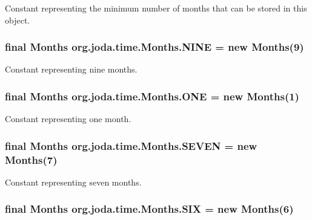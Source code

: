 Constant representing the minimum number of months that can be stored in this object. \hypertarget{classorg_1_1joda_1_1time_1_1_months_a513dd55161ce531a540faa3a09f97bb5}{
\subsubsection[{N\-I\-N\-E}]{\setlength{\rightskip}{0pt plus 5cm}final {\bf Months} org.\-joda.\-time.\-Months.\-N\-I\-N\-E = new {\bf Months}(9)\hspace{0.3cm}{\ttfamily [static]}}}\label{classorg_1_1joda_1_1time_1_1_months_a513dd55161ce531a540faa3a09f97bb5}
Constant representing nine months. \hypertarget{classorg_1_1joda_1_1time_1_1_months_a5b680c1f6a786d3eb07338f718637b5e}{
\subsubsection[{O\-N\-E}]{\setlength{\rightskip}{0pt plus 5cm}final {\bf Months} org.\-joda.\-time.\-Months.\-O\-N\-E = new {\bf Months}(1)\hspace{0.3cm}{\ttfamily [static]}}}\label{classorg_1_1joda_1_1time_1_1_months_a5b680c1f6a786d3eb07338f718637b5e}
Constant representing one month. \hypertarget{classorg_1_1joda_1_1time_1_1_months_a75a75c4e5e85d03201a8eaaab81e133b}{
\subsubsection[{S\-E\-V\-E\-N}]{\setlength{\rightskip}{0pt plus 5cm}final {\bf Months} org.\-joda.\-time.\-Months.\-S\-E\-V\-E\-N = new {\bf Months}(7)\hspace{0.3cm}{\ttfamily [static]}}}\label{classorg_1_1joda_1_1time_1_1_months_a75a75c4e5e85d03201a8eaaab81e133b}
Constant representing seven months. \hypertarget{classorg_1_1joda_1_1time_1_1_months_a0d136f270b7a74063c07dfff8133b493}{
\subsubsection[{S\-I\-X}]{\setlength{\rightskip}{0pt plus 5cm}final {\bf Months} org.\-joda.\-time.\-Months.\-S\-I\-X = new {\bf Months}(6)\hspace{0.3cm}{\ttfamily [static]}}}\label{classorg_1_1joda_1_1time_1_1_months_a0d136f270b7a74063c07dfff8133b493}
